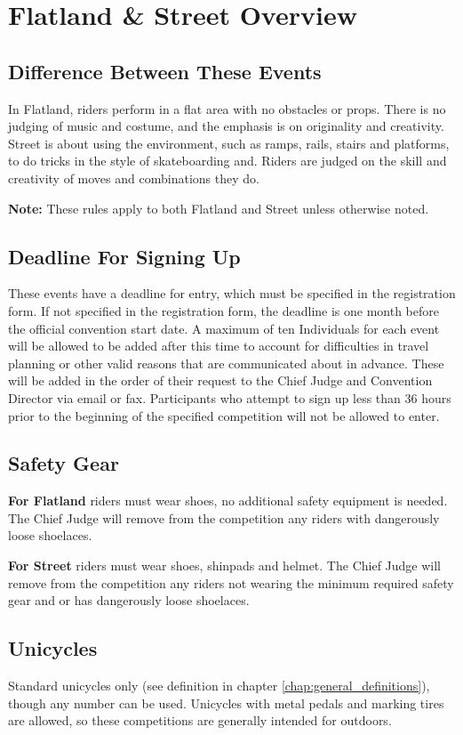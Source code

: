 \chapter{Flatland \& Street \label{chap:flat-street} Overview}

\section{Difference Between These Events}
In Flatland, riders perform in a flat area with no obstacles or props.
There is no judging of music and costume, and the emphasis is on originality and creativity.
Street is about using the environment, such as ramps, rails, stairs and platforms, to do tricks in the style of skateboarding and.
Riders are judged on the skill and creativity of moves and combinations they do.

\textbf{Note:} These rules apply to both Flatland and Street unless otherwise noted.

\section{Deadline For Signing Up}
These events have a deadline for entry, which must be specified in the registration form.
If not specified in the registration form, the deadline is one month before the official convention start date.
A maximum of ten Individuals for each event will be allowed to be added after this time to account for difficulties in travel planning or other valid reasons that are communicated about in advance.
These will be added in the order of their request to the Chief Judge and Convention Director via email or fax.
Participants who attempt to sign up less than 36 hours prior to the beginning of the specified competition will not be allowed to enter.

\section{Safety Gear}
\textbf{For Flatland} riders must wear shoes, no additional safety equipment is needed.
The Chief Judge will remove from the competition any riders with dangerously loose shoelaces. 

\textbf{For Street} riders must wear shoes, shinpads and helmet.
The Chief Judge will remove from the competition any riders not wearing the minimum required safety gear and or has dangerously loose shoelaces.

\section{Unicycles}
Standard unicycles only (see definition in chapter \ref{chap:general_definitions}), though any number can be used.
Unicycles with metal pedals and marking tires are allowed, so these competitions are generally intended for outdoors.

